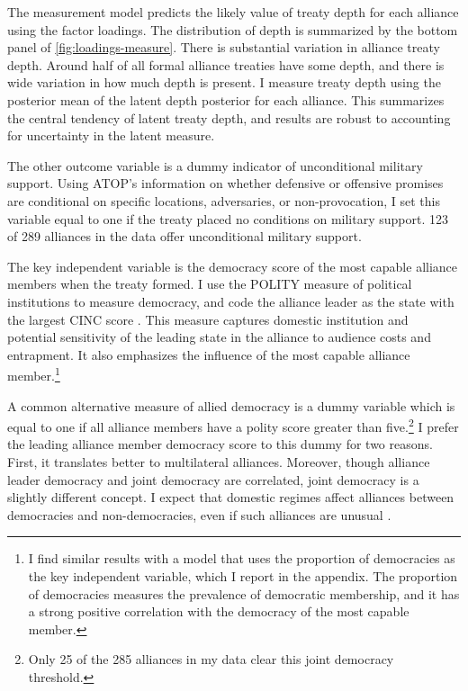 \documentclass[12pt]{article}
\begin{document}
The measurement model predicts the likely value of treaty depth for each alliance using the factor loadings. 
The distribution of depth is summarized by the bottom panel of \autoref{fig:loadings-measure}. 
There is substantial variation in alliance treaty depth. 
Around half of all formal alliance treaties have some depth, and there is wide variation in how much depth is present.
I measure treaty depth using the posterior mean of the latent depth posterior for each alliance. 
This summarizes the central tendency of latent treaty depth, and results are robust to accounting for uncertainty in the latent measure. 


The other outcome variable is a dummy indicator of unconditional military support. 
Using ATOP's information on whether defensive or offensive promises are conditional on specific locations, adversaries, or non-provocation, I set this variable equal to one if the treaty placed no conditions on military support.
123 of 289 alliances in the data offer unconditional military support. 


The key independent variable is the democracy score of the most capable alliance members when the treaty formed. 
I use the POLITY measure of political institutions to measure democracy, and code the alliance leader as the state with the largest CINC score \citep{SingerCINC1988}.
This measure captures domestic institution and potential sensitivity of the leading state in the alliance to audience costs and entrapment.
It also emphasizes the influence of the most capable alliance member.\footnote{I find similar results with a model that uses the proportion of democracies as the key independent variable, which I report in the appendix. The proportion of democracies measures the prevalence of democratic membership, and it has a strong positive correlation with the democracy of the most capable member.}    


A common alternative measure of allied democracy is a dummy variable which is equal to one if all alliance members have a polity score greater than five.\footnote{Only 25 of the 285 alliances in my data clear this joint democracy threshold.}
I prefer the leading alliance member democracy score to this dummy for two reasons.
First, it translates better to multilateral alliances. 
Moreover, though alliance leader democracy and joint democracy are correlated, joint democracy is a slightly different concept. 
I expect that domestic regimes affect alliances between democracies and non-democracies, even if such alliances are unusual \citep{Leeds1999}.
\end{document}
